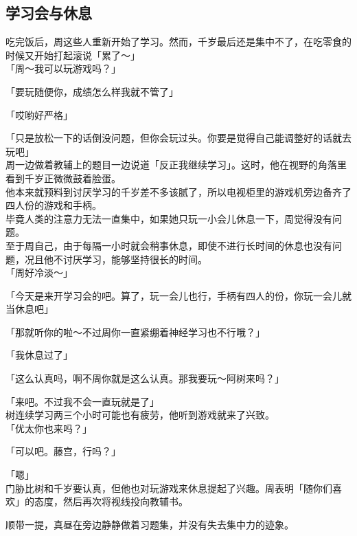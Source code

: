 \subsection{学习会与休息}

吃完饭后，周这些人重新开始了学习。然而，千岁最后还是集中不了，在吃零食的时候又开始打起滚说「累了～」\\

「周～我可以玩游戏吗？」

「要玩随便你，成绩怎么样我就不管了」

「哎哟好严格」

「只是放松一下的话倒没问题，但你会玩过头。你要是觉得自己能调整好的话就去玩吧」\\

周一边做着教辅上的题目一边说道「反正我继续学习」。这时，他在视野的角落里看到千岁正微微鼓着脸蛋。\\

他本来就预料到讨厌学习的千岁差不多该腻了，所以电视柜里的游戏机旁边备齐了四人份的游戏和手柄。\\

毕竟人类的注意力无法一直集中，如果她只玩一小会儿休息一下，周觉得没有问题。\\

至于周自己，由于每隔一小时就会稍事休息，即使不进行长时间的休息也没有问题，况且他不讨厌学习，能够坚持很长的时间。\\

「周好冷淡～」

「今天是来开学习会的吧。算了，玩一会儿也行，手柄有四人的份，你玩一会儿就当休息吧」

「那就听你的啦～不过周你一直紧绷着神经学习也不行哦？」

「我休息过了」

「这么认真吗，啊不周你就是这么认真。那我要玩～阿树来吗？」

「来吧。不过我不会一直玩就是了」\\

树连续学习两三个小时可能也有疲劳，他听到游戏就来了兴致。\\

「优太你也来吗？」

「可以吧。藤宫，行吗？」

「嗯」\\

门胁比树和千岁要认真，但他也对玩游戏来休息提起了兴趣。周表明「随你们喜欢」的态度，然后再次将视线投向教辅书。

顺带一提，真昼在旁边静静做着习题集，并没有失去集中力的迹象。\\

